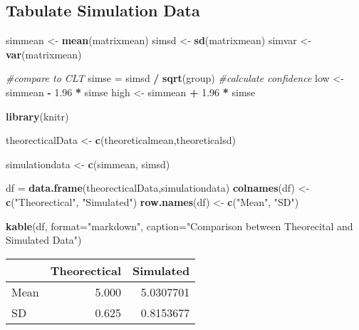 \documentclass[]{article}
\newenvironment{Shaded}{\begin{snugshade}}{\end{snugshade}}
\newcommand{\KeywordTok}[1]{\textcolor[rgb]{0.13,0.29,0.53}{\textbf{#1}}}
\newcommand{\DataTypeTok}[1]{\textcolor[rgb]{0.13,0.29,0.53}{#1}}
\newcommand{\FloatTok}[1]{\textcolor[rgb]{0.00,0.00,0.81}{#1}}
\newcommand{\StringTok}[1]{\textcolor[rgb]{0.31,0.60,0.02}{#1}}
\newcommand{\CommentTok}[1]{\textcolor[rgb]{0.56,0.35,0.01}{\textit{#1}}}
\newcommand{\OperatorTok}[1]{\textcolor[rgb]{0.81,0.36,0.00}{\textbf{#1}}}
\newcommand{\NormalTok}[1]{#1}
\begin{document}
\subsection{Tabulate Simulation Data}\label{tabulate-simulation-data}

\begin{Shaded}
\begin{Highlighting}[]
\NormalTok{simmean <-}\StringTok{ }\KeywordTok{mean}\NormalTok{(matrixmean)}
\NormalTok{simsd <-}\StringTok{ }\KeywordTok{sd}\NormalTok{(matrixmean)}
\NormalTok{simvar <-}\StringTok{ }\KeywordTok{var}\NormalTok{(matrixmean)}

\CommentTok{#compare to CLT}
\NormalTok{simse =}\StringTok{ }\NormalTok{simsd }\OperatorTok{/}\StringTok{ }\KeywordTok{sqrt}\NormalTok{(group)}
\CommentTok{#calculate confidence}
\NormalTok{low <-}\StringTok{ }\NormalTok{simmean }\OperatorTok{-}\StringTok{ }\FloatTok{1.96} \OperatorTok{*}\StringTok{ }\NormalTok{simse}
\NormalTok{high <-}\StringTok{ }\NormalTok{simmean }\OperatorTok{+}\StringTok{ }\FloatTok{1.96} \OperatorTok{*}\StringTok{ }\NormalTok{simse}

\KeywordTok{library}\NormalTok{(knitr)}

\NormalTok{theorecticalData <-}\StringTok{ }\KeywordTok{c}\NormalTok{(theoreticalmean,theoreticalsd)}

\NormalTok{simulationdata <-}\StringTok{ }\KeywordTok{c}\NormalTok{(simmean, simsd)}

\NormalTok{df =}\StringTok{ }\KeywordTok{data.frame}\NormalTok{(theorecticalData,simulationdata)}
\KeywordTok{colnames}\NormalTok{(df) <-}\StringTok{ }\KeywordTok{c}\NormalTok{(}\StringTok{"Theorectical"}\NormalTok{, }\StringTok{"Simulated"}\NormalTok{)}
\KeywordTok{row.names}\NormalTok{(df) <-}\StringTok{ }\KeywordTok{c}\NormalTok{(}\StringTok{"Mean"}\NormalTok{, }\StringTok{"SD"}\NormalTok{)}

\KeywordTok{kable}\NormalTok{(df, }\DataTypeTok{format=}\StringTok{"markdown"}\NormalTok{, }\DataTypeTok{caption=}\StringTok{"Comparison between Theorecital and Simulated Data"}\NormalTok{)}
\end{Highlighting}
\end{Shaded}

\begin{longtable}[]{@{}lrr@{}}
\toprule
& Theorectical & Simulated\tabularnewline
\midrule
\endhead
Mean & 5.000 & 5.0307701\tabularnewline
SD & 0.625 & 0.8153677\tabularnewline
\bottomrule
\end{longtable}
\end{document}
